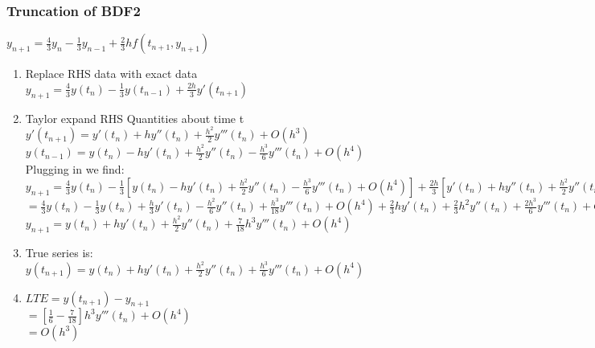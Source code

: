 \documentclass[12pt]{article}
\begin{document}
	\subsubsection{Truncation of BDF2}
	$y_{n+1} = \frac{4}{3}y_n - \frac{1}{3}y_{n-1} + \frac{2}{3}hf(t_{n+1}, y_{n+1})$\\
	\begin{enumerate}
		\item Replace RHS data with exact data\\
		$y_{n+1} = \frac{4}{3}y(t_n) - \frac{1}{3}y(t_{n-1}) + \frac{2h}{3}y'(t_{n+1})$\\
		\item Taylor expand RHS Quantities about time t\\
		$y'(t_{n+1}) = y'(t_n) + hy''(t_n) + \frac{h^2}{2}y'''(t_n) + O(h^3)$\\
		$y(t_{n-1}) = y(t_n) - hy'(t_n) + \frac{h^2}{2}y''(t_n) - \frac{h^3}{6}y'''(t_n) + O(h^4)$\\
		Plugging in we find:\\
		$y_{n+1} = \frac{4}{3}y(t_n) - \frac{1}{3}[y(t_n) - hy'(t_n) + \frac{h^2}{2}y''(t_n) - \frac{h^3}{6}y'''(t_n) + O(h^4)] + \frac{2h}{3}[y'(t_n) + hy''(t_n) + \frac{h^2}{2}y''(t_n) + O(h^3)]$\\
		$= \frac{4}{3}y(t_n) - \frac{1}{3}y(t_n) + \frac{h}{3}y'(t_n) - \frac{h^2}{6}y''(t_n) + \frac{h^3}{18}y'''(t_n) + O(h^4) + \frac{2}{3}hy'(t_n) + \frac{2}{3}h^2y''(t_n) + \frac{2h^3}{6}y'''(t_n) + O(h^4)$\\
		$y_{n+1} = y(t_n) + hy'(t_n) + \frac{h^2}{2}y''(t_n) + \frac{7}{18}h^3y'''(t_n) + O(h^4)$
		\item True series is:\\
		$y(t_{n+1}) = y(t_n) + hy'(t_n) + \frac{h^2}{2}y''(t_n) + \frac{h^3}{6}y'''(t_n) + O(h^4)$\\
		\item $LTE = y(t_{n+1}) - y_{n+1}$\\
		$= [\frac{1}{6} - \frac{7}{18}]h^3y'''(t_n) + O(h^4)$\\
		$= O(h^3)$
	\end{enumerate}
	
	
	
\end{document}
